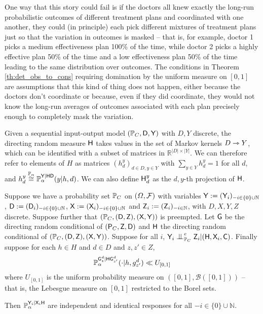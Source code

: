 One way that this story could fail is if the doctors all knew exactly the long-run probabilistic outcomes of different treatment plans and coordinated with one another, they could (in principle) each pick different mixtures of treatment plans just so that the variation in outcomes is masked -- that is, for example, doctor 1 picks a medium effectiveness plan 100\% of the time, while doctor 2 picks a highly effective plan 50\% of the time and a low effectiveness plan 50\% of the time leading to the same distribution over outcomes. The conditions in Theorem \ref{th:det_obs_to_cons} requiring domination by the uniform measure on $[0,1]$ are assumptions that this kind of thing does not happen, either because the doctors don't coordinate or because, even if they did coordinate, they would not know the long-run averages of outcomes associated with each plan precisely enough to completely mask the variation.

\begin{notation}
Given a sequential input-output model $(\mathbb{P}_C,\mathsf{D},\mathsf{Y})$ with $D,Y$ discrete, the directing random measure $\mathsf{H}$ takes values in the set of Markov kernels $D\rightarrowtriangle Y$, which can be identified with a subset of matrices in $\mathbb{R}^{|D|\times |Y|}$. We can therefore refer to elements of $H$ as matrices $(h_d^y)_{d\in D,y\in Y}$ with $\sum_{y\in Y} h_d^y = 1$ for all $d$, and $h_d^y\overset{\mathbb{P}_\alpha}{\cong}\mathbb{P}_\alpha^{\mathsf{Y}|\mathsf{H}\mathsf{D}}(y|h,d)$. We can also define $\mathsf{H}_d^y$ as the $d,y$-th projection of $\mathsf{H}$.
\end{notation}

\begin{theorem}\label{th:det_obs_to_cons}
Suppose we have a probability set $\mathbb{P}_C$ on $(\Omega,\mathcal{F})$ with variables $\mathsf{Y}:=(\mathsf{Y}_i)_{-i\in \{0\}\cup\mathbb{N}}$, $\mathsf{D}:=(\mathsf{D}_i)_{-i\in \{0\}\cup\mathbb{N}}$, $\mathsf{X}:=(\mathsf{X}_i)_{-i\in \{0\}\cup\mathbb{N}}$ and $\mathsf{Z}_i:= (\mathsf{Z}_i)_{-i\in \mathbb{N}}$, with $D,X,Y,Z$ discrete. Suppose further that $(\mathbb{P}_C,(\mathsf{D},\mathsf{Z}),(\mathsf{X},\mathsf{Y}))$ is preempted. Let $\mathsf{G}$ be the directing random conditional of $(\mathsf{P}_C,\mathsf{Z},\mathsf{D})$ and $\mathsf{H}$ the directing random conditional of $(\mathbb{P}_C,(\mathsf{D},\mathsf{Z}),(\mathsf{X},\mathsf{Y}))$. Suppose for all $i$, $\RV{Y}_i\CI^e_{\prob{P}_C} \RV{Z}_i|(\RV{H},\RV{X}_i,\RV{C})$. Finally suppose for each $h\in H$ and $d\in D$ and $z,z'\in Z$,
\begin{align}
    \mathbb{P}_\alpha^{\mathsf{G}^d_{z}|\mathsf{H}\mathsf{G}^d_{z'}}(\cdot|h,g^d_{z'}) \ll U_{[0,1]}\label{eq:lebesgue_dom}
\end{align}
where $U_{[0,1]}$ is the uniform probability measure on $([0,1],\mathcal{B}([0,1]))$ -- that is, the Lebesgue measure on $[0,1]$ restricted to the Borel sets.

Then $\mathbb{P}_\alpha^{\mathsf{Y}_i|\mathsf{X}_i\mathsf{H}}$ are independent and identical responses for all $-i\in\{0\}\cup\mathbb{N}$.
\end{theorem}


